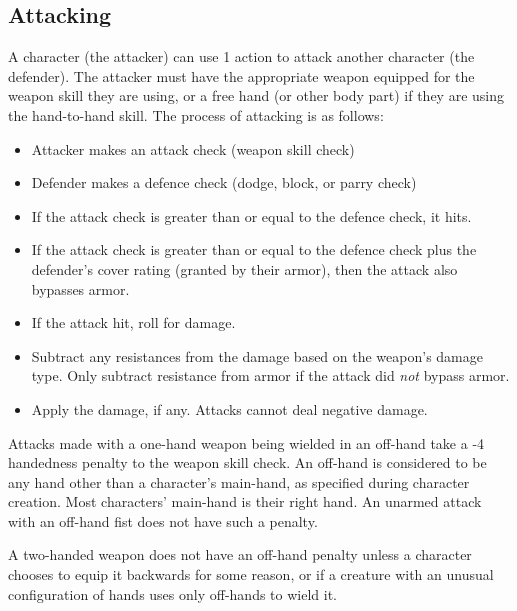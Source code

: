 \begin{multicols*}{2}
    \section{Attacking}\label{combat:attacking}
    A character (the attacker) can use 1 action to attack another character
    (the defender). The attacker must have the appropriate weapon equipped
    for the weapon skill they are using, or a free hand (or other body part)
    if they are using the hand-to-hand skill. The process of attacking is as
    follows:
    \begin{itemize}
        \item Attacker makes an attack check (weapon skill check)
        \item Defender makes a defence check (dodge, block, or parry check)
        \item If the attack check is greater than or equal to the defence
            check, it hits.
        \item If the attack check is greater than or equal to the defence check
            plus the defender's cover rating (granted by
            their armor), then the attack also bypasses armor.
        \item If the attack hit, roll for damage.
        \item Subtract any resistances from the damage based
            on the weapon's damage type. Only subtract resistance from armor
            if the attack did \textit{not} bypass armor.
        \item Apply the damage, if any. Attacks cannot deal negative damage.
    \end{itemize}

    Attacks made with a one-hand weapon being wielded in an off-hand take a -4
    handedness penalty to the weapon skill check. An off-hand is considered to
    be any hand other than a character's main-hand, as specified during
    character creation. Most characters' main-hand is their right hand.
    An unarmed attack with an off-hand fist does not have such a penalty.

    A two-handed weapon does not have an off-hand penalty unless a character
    chooses to equip it backwards for some reason, or if a creature with an
    unusual configuration of hands uses only off-hands to wield it.


\end{multicols*}
